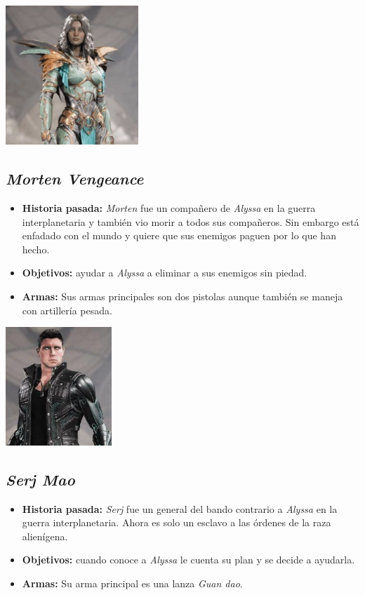 \documentclass[11pt, twoside]{article}
\begin{document}
\begin{center}
\includegraphics[width=5cm]{./images/alyssa.jpg}
\end{center}

\subsection{\textit{Morten Vengeance}}
\begin{itemize}
\item \textbf{Historia pasada:} \textit{Morten} fue un compañero de \textit{Alyssa} en la guerra interplanetaria y también vio morir a todos sus compañeros. Sin embargo está enfadado con el mundo y quiere que sus enemigos paguen por lo que han hecho. 
\item \textbf{Objetivos:} ayudar a \textit{Alyssa} a eliminar a sus enemigos sin piedad. 
\item \textbf{Armas:} Sus armas principales son dos pistolas aunque también se maneja con artillería pesada. 
\end{itemize}

\begin{center}
\includegraphics[width=4cm]{./images/morten.jpg}
\end{center}

\subsection{\textit{Serj Mao}}
\begin{itemize}
\item \textbf{Historia pasada:} \textit{Serj} fue un general del bando contrario a \textit{Alyssa} en la guerra interplanetaria. Ahora es solo un esclavo a las órdenes de la raza alienígena.
\item \textbf{Objetivos:} cuando conoce a \textit{Alyssa} le cuenta su plan y se decide a ayudarla. 
\item \textbf{Armas:} Su arma principal es una lanza \textit{Guan dao}.
\end{itemize}
\end{document}
